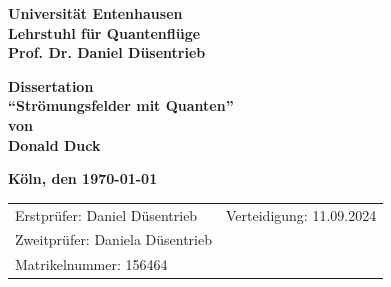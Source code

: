\documentclass[12pt,ngerman,parskip=half]{scrbook}
\begin{document}
\begin{titlepage}
{\Large\bfseries Universität Entenhausen \\
Lehrstuhl für Quantenflüge \\
Prof. Dr. Daniel Düsentrieb}

\vspace*{4cm}
\begin{center}
\LARGE\bfseries Dissertation \\
\enquote{Strömungsfelder mit Quanten} \\
von \\
Donald Duck
\end{center}

\vspace*{2cm}
\begin{center}
\Large\bfseries Köln, den \today
\end{center}

\begin{center}
\end{center}


\vfill
{\large \begin{tabular}{p{12cm}r}
Erstprüfer: Daniel Düsentrieb &  Verteidigung: 11.09.2024 \\
Zweitprüfer: Daniela Düsentrieb & \\
Matrikelnummer: 156464 &  \\
\end{tabular}}


\end{titlepage}
\end{document}
